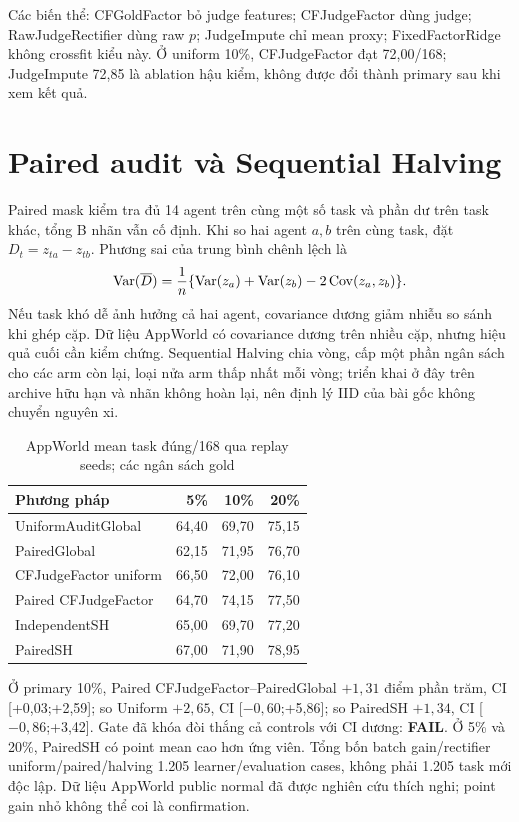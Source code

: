 \documentclass[11pt,a4paper,openany]{book}
\newcommand{\status}[1]{\textbf{#1}}
\begin{document}
Các biến thể: CFGoldFactor bỏ judge features; CFJudgeFactor dùng judge; RawJudgeRectifier dùng raw \(p\); JudgeImpute chỉ mean proxy; FixedFactorRidge không crossfit kiểu này. Ở uniform 10\%, CFJudgeFactor đạt 72,00/168; JudgeImpute 72,85 là ablation hậu kiểm, không được đổi thành primary sau khi xem kết quả.

\section{Paired audit và Sequential Halving}
Paired mask kiểm tra đủ 14 agent trên cùng một số task và phần dư trên task khác, tổng B nhãn vẫn cố định. Khi so hai agent \(a,b\) trên cùng task, đặt \(D_t=z_{ta}-z_{tb}\). Phương sai của trung bình chênh lệch là
\begin{equation}\label{eq:pairvar}\operatorname{Var}(\overline D)=\frac1n\{\operatorname{Var}(z_a)+\operatorname{Var}(z_b)-2\operatorname{Cov}(z_a,z_b)\}.
\end{equation}
Nếu task khó dễ ảnh hưởng cả hai agent, covariance dương giảm nhiễu so sánh khi ghép cặp. Dữ liệu AppWorld có covariance dương trên nhiều cặp, nhưng hiệu quả cuối cần kiểm chứng. Sequential Halving \cite{seqhalving} chia vòng, cấp một phần ngân sách cho các arm còn lại, loại nửa arm thấp nhất mỗi vòng; triển khai ở đây trên archive hữu hạn và nhãn không hoàn lại, nên định lý IID của bài gốc không chuyển nguyên xi.

\begin{table}[htbp]\centering\small\caption{AppWorld mean task đúng/168 qua replay seeds; các ngân sách gold}\label{tab:rect}\begin{tabular}{lrrr}\toprule Phương pháp & 5\% & 10\% & 20\%\\\midrule UniformAuditGlobal & 64,40 & 69,70 & 75,15\\ PairedGlobal & 62,15 & 71,95 & 76,70\\ CFJudgeFactor uniform & 66,50 & 72,00 & 76,10\\ Paired CFJudgeFactor & 64,70 & 74,15 & 77,50\\ IndependentSH & 65,00 & 69,70 & 77,20\\ PairedSH & 67,00 & 71,90 & 78,95\\\bottomrule\end{tabular}\end{table}
Ở primary 10\%, Paired CFJudgeFactor--PairedGlobal \(+1,31\) điểm phần trăm, CI [+0,03;+2,59]; so Uniform \(+2,65\), CI [\(-0,60\);+5,86]; so PairedSH \(+1,34\), CI [\(-0,86\);+3,42]. Gate đã khóa đòi thắng cả controls với CI dương: \status{FAIL}. Ở 5\% và 20\%, PairedSH có point mean cao hơn ứng viên. Tổng bốn batch gain/rectifier uniform/paired/halving 1.205 learner/evaluation cases, không phải 1.205 task mới độc lập. Dữ liệu AppWorld public normal đã được nghiên cứu thích nghi; point gain nhỏ không thể coi là confirmation.
\end{document}
